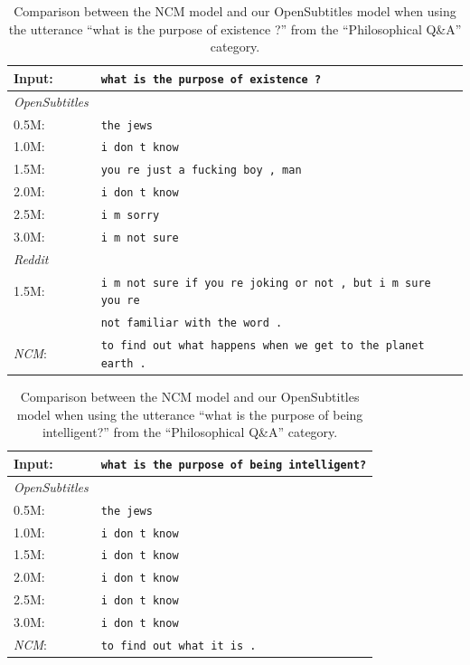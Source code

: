 \begin{table}[H]
	\centering
	\begin{adjustbox}{max width=\textwidth}
		\begin{tabularx}{\textwidth}{lX}
			\toprule
			Input: 	& \texttt{what is the purpose of existence ?}\\
			\midrule
			\emph{OpenSubtitles}\\
			0.5M: 	& \texttt{the jews}\\
			1.0M: 	& \texttt{i don t know}\\
			1.5M:	& \texttt{you re just a fucking boy , man}\\
			2.0M:	& \texttt{i don t know}\\
			2.5M:	& \texttt{i m sorry}\\
			3.0M:	& \texttt{i m not sure}\\
			\midrule
			\emph{Reddit}\\
			1.5M:	& \texttt{i m not sure if you re joking or not , but i m sure you re }\\
			& \texttt{not familiar with the word .}\\
			\midrule
			\emph{NCM}:	& \texttt{to find out what happens when we get to the planet earth .}\\
			\bottomrule
		\end{tabularx}
	\end{adjustbox}
	\caption{Comparison between the NCM model and our OpenSubtitles model when using the utterance ``what is the purpose of existence ?'' from the ``Philosophical Q\&A'' category.}
	\label{results:example13_output:Neural_Conversational_Model_compared}
\end{table}

\begin{table}[H]
	\centering
	\begin{adjustbox}{max width=\textwidth}
		\begin{tabularx}{\textwidth}{lX}
			\toprule
			Input: 	& \texttt{what is the purpose of being intelligent?}\\
			\midrule
			\emph{OpenSubtitles}\\
			0.5M: 	& \texttt{the jews}\\
			1.0M: 	& \texttt{i don t know}\\
			1.5M:	& \texttt{i don t know}\\
			2.0M:	& \texttt{i don t know}\\
			2.5M:	& \texttt{i don t know}\\
			3.0M:	& \texttt{i don t know}\\
			\midrule
			\emph{NCM}:	& \texttt{to find out what it is .}\\
			\bottomrule
		\end{tabularx}
	\end{adjustbox}
	\caption{Comparison between the NCM model and our OpenSubtitles model when using the utterance ``what is the purpose of being intelligent?'' from the ``Philosophical Q\&A'' category.}
	\label{results:example20_output:OpenSubtitle}
\end{table}


